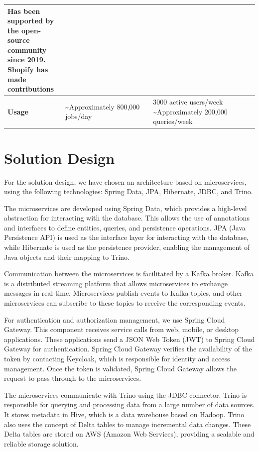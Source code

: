 \begin{longtable}{|p{0.23\linewidth}|p{0.35\linewidth}|p{0.42\linewidth}|}
Has been supported by the open-source community since 2019. Shopify has made contributions \\ \hline
\textbf{Usage} & 
\textasciitilde Approximately 800,000 jobs/day &
3000 active users/week \newline
\textasciitilde Approximately 200,000 queries/week \\ \hline
\end{longtable}

\section{Solution Design}

For the solution design, we have chosen an architecture based on microservices, using the following technologies: Spring Data, JPA, Hibernate, JDBC, and Trino.

The microservices are developed using Spring Data, which provides a high-level abstraction for interacting with the database. This allows the use of annotations and interfaces to define entities, queries, and persistence operations. JPA (Java Persistence API) is used as the interface layer for interacting with the database, while Hibernate is used as the persistence provider, enabling the management of Java objects and their mapping to Trino.

Communication between the microservices is facilitated by a Kafka broker. Kafka is a distributed streaming platform that allows microservices to exchange messages in real-time. Microservices publish events to Kafka topics, and other microservices can subscribe to these topics to receive the corresponding events.

For authentication and authorization management, we use Spring Cloud Gateway. This component receives service calls from web, mobile, or desktop applications. These applications send a JSON Web Token (JWT) to Spring Cloud Gateway for authentication. Spring Cloud Gateway verifies the availability of the token by contacting Keycloak, which is responsible for identity and access management. Once the token is validated, Spring Cloud Gateway allows the request to pass through to the microservices.

The microservices communicate with Trino using the JDBC connector. Trino is responsible for querying and processing data from a large number of data sources. It stores metadata in Hive, which is a data warehouse based on Hadoop. Trino also uses the concept of Delta tables to manage incremental data changes. These Delta tables are stored on AWS (Amazon Web Services), providing a scalable and reliable storage solution.

